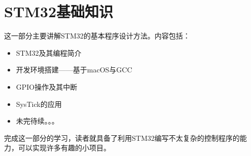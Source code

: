 \part{STM32基础知识}

这一部分主要讲解STM32的基本程序设计方法。内容包括：
\begin{itemize}
	\item STM32及其编程简介
	\item 开发环境搭建——基于macOS与GCC
	\item GPIO操作及其中断
	\item SysTick的应用
	\item 未完待续。。。
\end{itemize}

完成这一部分的学习，读者就具备了利用STM32编写不太复杂的控制程序的能力，可以实现许多有趣的小项目。
